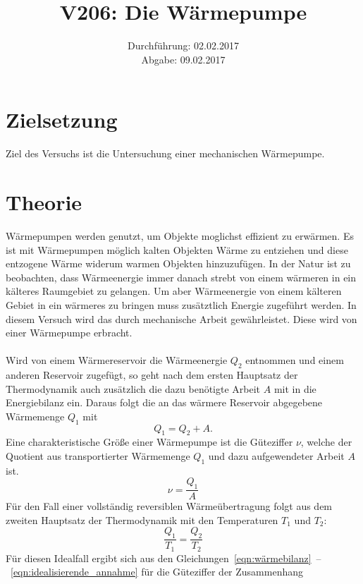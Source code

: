 \documentclass[
  bibliography=totoc,     %
  captions=tableheading,  %
  titlepage=firstiscover, %
]{scrartcl}
\title{V206: Die Wärmepumpe}
\author{
  Simon Schulte
  \texorpdfstring{
    \\
    \href{mailto:simon.schulte@udo.edu}{simon.schulte@udo.edu}
  }{}
  \texorpdfstring{\and}{, }
  Tim Sedlaczek
  \texorpdfstring{
    \\
    \href{mailto:tim.sedlaczek@udo.edu}{tim.sedlaczek@udo.edu}
  }{}
}
\date{Durchführung: 02.02.2017\\
      Abgabe: 09.02.2017}
\begin{document}
\maketitle
\thispagestyle{empty}
\tableofcontents
\newpage
\section{Zielsetzung}
\label{sec:zielsetzung}
Ziel des Versuchs ist die Untersuchung einer mechanischen Wärmepumpe.
\section{Theorie}
\label{sec:theorie}
Wärmepumpen werden genutzt, um Objekte moglichst effizient zu erwärmen.
Es ist mit Wärmepumpen möglich kalten Objekten Wärme zu entziehen und diese
entzogene Wärme widerum warmen Objekten hinzuzufügen. In der Natur ist zu
beobachten, dass Wärmeenergie immer danach strebt von einem wärmeren in ein
kälteres Raumgebiet zu gelangen. Um aber Wärmeenergie von einem kälteren Gebiet
in ein wärmeres zu bringen muss zusätztlich Energie zugeführt werden.
In diesem Versuch wird das durch mechanische Arbeit gewährleistet. Diese wird
von einer Wärmepumpe erbracht. \\
\\
Wird von einem Wärmereservoir die Wärmeenergie
$Q_2$ entnommen und einem anderen Reservoir zugefügt, so geht nach dem ersten
Hauptsatz der Thermodynamik auch zusätzlich die dazu benötigte Arbeit $A$ mit
in die Energiebilanz ein. Daraus folgt die an das wärmere Reservoir abgegebene
Wärmemenge $Q_1$ mit
\begin{equation}
    Q_1=Q_2+A.
    \label{eqn:wärmebilanz}
\end{equation}
Eine charakteristische Größe einer Wärmepumpe ist die Güteziffer $ν$, welche der
Quotient aus transportierter Wärmemenge $Q_1$ und dazu aufgewendeter Arbeit $A$
ist.
\begin{equation}
    \nu=\frac{Q_1}{A}
    \label{eqn:güteziffer}
\end{equation}
Für den Fall einer vollständig reversiblen Wärmeübertragung folgt aus dem
zweiten Hauptsatz der Thermodynamik mit den Temperaturen $T_1$ und $T_2$:
\begin{equation}
    \frac{Q_1}{T_1}=\frac{Q_2}{T_2}
    \label{eqn:idealisierende_annahme}
\end{equation}
Für diesen Idealfall ergibt sich aus den
Gleichungen~\eqref{eqn:wärmebilanz}~--~\eqref{eqn:idealisierende_annahme} für die
Güteziffer der Zusammenhang
\end{document}
